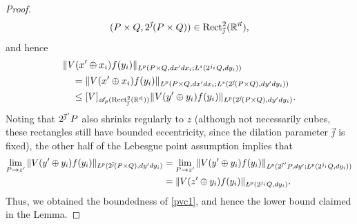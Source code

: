 \documentclass[11pt, reqno]{amsart}
\theoremstyle{definition}
\theoremstyle{remark}
\numberwithin{equation}{section}
\newcommand{\A}{\mathscr A}
\newcommand{\R}{\mathbb R}
\newcommand{\vj}{\vec{\textit{\j}}}
\newcommand{\vjprime}{\vj\,{}'}
\newcommand{\vn}{\vec n}
\newcommand{\aveL}{\textit{\L}}
\newcommand{\Norm}[2]{\|#1\|_{#2}}
\newcommand{\Rect}{\mathrm{Rect}}
\begin{document}
\begin{proof}
\begin{equation*}
  (P\times Q,2^{\vj}(P\times Q))\in\Rect^2_{\vj}(\R^{\vn}),
\end{equation*}
and hence
\begin{align*}
&\Norm{V(x'\oplus x_i)f(y_i)}{\aveL^p(P\times Q,dx'dx_i;\aveL^s(2^{j_i}Q,dy_i))}\\
&\quad= \Norm{V(x'\oplus x_i)f(y_i)}{\aveL^p(P\times Q,dx'dx_i;\aveL^s(2^{\vj}(P\times Q),dy'dy_i))} \\
&\quad\leq [V]_{\A_p(\Rect_{\vj}^2(\R^{\vn}))}
\Norm{V(y'\oplus y_i)f(y_i)}{\aveL^p(2^{\vj}(P\times Q),dy'dy_i)}.
\end{align*}
Noting that $2^{\vjprime}P$ also shrinks regularly to $z$ (although not necessarily cubes, these rectangles still have bounded eccentricity, since the dilation parameter $\vj$ is fixed), the other half of the Lebesgue point assumption implies that
\begin{align*}
\lim_{P\to z'}\Norm{V(y'\oplus y_i)f(y_i)}{\aveL^p(2^{\vj}(P\times Q),dy'dy_i)}
&=\lim_{P\to z'}\Norm{V(y'\oplus y_i)f(y_i)}{\aveL^p(2^{\vjprime}P,dy';\aveL^p(2^{j_i}Q,dy_i))} \\
&=\Norm{V(z'\oplus y_i)f(y_i)}{\aveL^p(2^{j_i}Q,dy_i)}.
\end{align*}
Thus, we obtained the boundedness of \eqref{pvc1}, and hence the lower bound claimed in the Lemma.


\end{proof}
\end{document}
